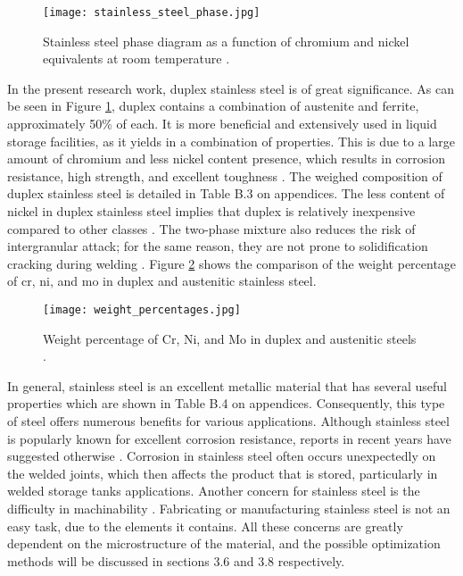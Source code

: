 \begin{figure}[H]
    \centering
    \texttt{[image: stainless\_steel\_phase.jpg]}
    \caption{Stainless steel phase diagram as a function of chromium and nickel equivalents at room temperature \cite{bhadeshia2017steels}.}
    \label{ch3:figure:steel_phase}
\end{figure}

In the present research work, duplex stainless steel is of great significance. As can be seen in Figure \ref{ch3:figure:steel_phase}, duplex contains a combination of austenite and ferrite, approximately 50\% of each. It is more beneficial and extensively used in liquid storage facilities, as it yields in a combination of properties. This is due to a large amount of chromium and less nickel content presence, which results in corrosion resistance, high strength, and excellent toughness \cite{gunn1997duplex}. The weighed composition of duplex stainless steel is detailed in Table B.3 on appendices. The less content of nickel in duplex stainless steel implies that duplex is relatively inexpensive compared to other classes \cite{sourmail2005stainless}. The two-phase mixture also reduces the risk of intergranular attack; for the same reason, they are not prone to solidification cracking during welding \cite{sourmail2005stainless}. Figure \ref{ch3:figure:weight} shows the comparison of the weight percentage of \acrfull{cr}, \acrfull{ni}, and \acrfull{mo} in duplex and austenitic stainless steel.
 
\begin{figure}[H]
    \centering
    \texttt{[image: weight\_percentages.jpg]}
    \caption{Weight percentage of Cr, Ni, and Mo in duplex and austenitic steels \cite{sourmail2005stainless}.}
    \label{ch3:figure:weight}
\end{figure}

In general, stainless steel is an excellent metallic material that has several useful properties which are shown in Table B.4 on appendices. Consequently, this type of steel offers numerous benefits for various applications. Although stainless steel is popularly known for excellent corrosion resistance, reports in recent years have suggested otherwise \cite{karayan2014weld}. Corrosion in stainless steel often occurs unexpectedly on the welded joints, which then affects the product that is stored, particularly in welded storage tanks applications. Another concern for stainless steel is the difficulty in machinability \cite{grzesik2008advanced}. Fabricating or manufacturing stainless steel is not an easy task, due to the elements it contains. All these concerns are greatly dependent on the microstructure of the material, and the possible optimization methods will be discussed in sections 3.6 and 3.8 respectively.

